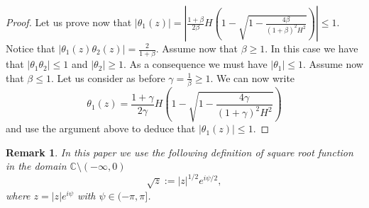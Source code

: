 \documentclass{article}
\numberwithin{equation}{section}
\theoremstyle{plain}
\newtheorem{remark}[theorem]{Remark}
\begin{document}
\begin{proof}
  Let us prove now that $| \theta_1 (z) | = \left| \frac{1+\beta}{2 \beta} H  \left( 1- \sqrt{1- \frac{4 \beta}{(1+\beta )^2 H^2}} \right) \right| \leq 1 $.
  Notice that $|\theta_1(z) \theta_2(z) | =\frac{2}{1+\beta} $. Assume now that $ \beta \geq 1 $. In this case we have that $|\theta_1 \theta_2 | \leq 1 $ and $|\theta_2 | \geq 1$. As a consequence we must have $|\theta_1| \leq 1 $. 
  Assume now that $\beta \leq 1 $. Let us consider as before $\gamma =\frac{1}{\beta } \geq 1$. 
  We can now write
  \[
  \theta_1 (z)  = \frac{1+\gamma}{2 \gamma} H  \left( 1- \sqrt{1- \frac{4 \gamma}{(1+\gamma )^2 H^2}} \right) 
  \] 
  and use the argument above to deduce that $|\theta_1 (z) |\leq 1 $. 
\end{proof}

\begin{remark}
    In this paper we use the following definition of square root function in the domain $\mathbb C \setminus (- \infty , 0 )$
    \[
    \sqrt{z}:= |z|^{1/2} e^{i \psi /2} , 
    \]
    where $z= |z| e^{i \psi} $  with  $\psi \in (- \pi, \pi]$. 
\end{remark}
\end{document}
